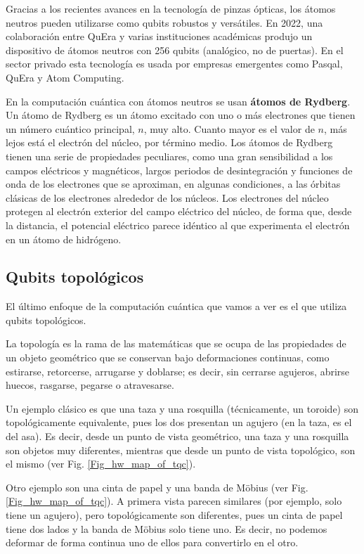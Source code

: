 Gracias a los recientes avances en la tecnología de pinzas ópticas, los átomos neutros pueden utilizarse como qubits robustos y versátiles. En 2022, una colaboración entre QuEra y varias instituciones académicas produjo un dispositivo de átomos neutros con 256 qubits \cite{bib_hw_QuEra_aquila} (analógico, no de puertas). En el sector privado esta tecnología es usada por empresas emergentes como Pasqal, QuEra y Atom Computing. 

En la computación cuántica con átomos neutros se usan \textbf{átomos de Rydberg}. Un átomo de Rydberg es un átomo excitado con uno o más electrones que tienen un número cuántico principal, $n$, muy alto. Cuanto mayor es el valor de $n$, más lejos está el electrón del núcleo, por término medio. Los átomos de Rydberg tienen una serie de propiedades peculiares, como una gran sensibilidad a los campos eléctricos y magnéticos, largos periodos de desintegración y funciones de onda de los electrones que se aproximan, en algunas condiciones, a las órbitas clásicas de los electrones alrededor de los núcleos. Los electrones del núcleo protegen al electrón exterior del campo eléctrico del núcleo, de forma que, desde la distancia, el potencial eléctrico parece idéntico al que experimenta el electrón en un átomo de hidrógeno.

		\subsection{Qubits topológicos}

El último enfoque de la computación cuántica que vamos a ver es el que utiliza qubits topológicos. 

La topología es la rama de las matemáticas que se ocupa de las propiedades de un objeto geométrico que se conservan bajo deformaciones continuas, como estirarse, retorcerse, arrugarse y doblarse; es decir, sin cerrarse agujeros, abrirse huecos, rasgarse, pegarse o atravesarse. 

Un ejemplo clásico es que una taza y una rosquilla (técnicamente, un toroide) son topológicamente equivalente, pues los dos presentan un agujero (en la taza, es el del asa). Es decir, desde un punto de vista geométrico, una taza y una rosquilla son objetos muy diferentes, mientras que desde un punto de vista topológico, son el mismo (ver Fig. \ref{Fig_hw_map_of_tqc}).

Otro ejemplo son una cinta de papel y una banda de Möbius (ver Fig. \ref{Fig_hw_map_of_tqc}). A primera vista parecen similares (por ejemplo, solo tiene un agujero), pero topológicamente son diferentes, pues un cinta de papel tiene dos lados y la banda de Möbius solo tiene uno. Es decir, no podemos deformar de forma continua uno de ellos para convertirlo en el otro.

